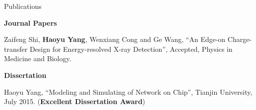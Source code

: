 \begin{rSection}{Publications}


\textbf{Journal Papers}
\begin{description}[font=\normalfont]
\item[{[J1]}]{
    Zaifeng Shi, \textbf{Haoyu Yang}, Wenxiang Cong and Ge Wang,
    ``An Edge-on Charge-transfer Design for Energy-resolved X-ray Detection'', Accepted,
    Physics in Medicine and Biology.
}

\end{description}




\textbf{Dissertation}
\begin{description}[font=\normalfont]
\item[{[B.Eng.]}]{
    Haoyu Yang,
    ``Modeling and Simulating of Network on Chip'',
    Tianjin University, July 2015.
    (\textbf{Excellent Dissertation Award})
}
\end{description}





\end{rSection}

